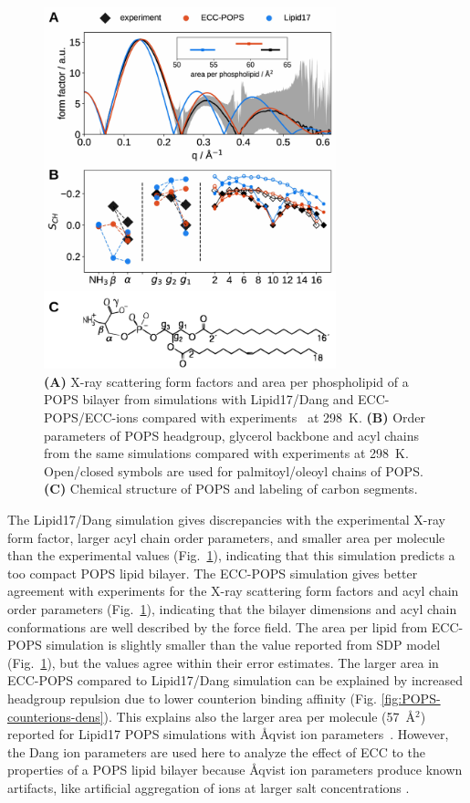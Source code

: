 \documentclass[journal=jctcce,manuscript=article]{achemso}
\begin{document}
\begin{figure}[tb!] 
  \centering 
  \includegraphics[width=3.33in]{../img/formF_OPs_APLinset_POPSchemfig.pdf} 
\hfill
  \caption{\label{simVSexpNOions_POPS} 
    \textbf{(A)} X-ray scattering form factors and area per phospholipid of a POPS bilayer
    from simulations with Lipid17/Dang \citep{lipid17-future, dang2006} and 
    ECC-POPS/ECC-ions \cite{martinek17, Pluhackova2016} compared with experiments~\citep{kucerka14} at 298~K. 
    \textbf{(B)} Order parameters of POPS headgroup, glycerol backbone and acyl chains  
    from the same simulations 
    compared with experiments at 298~K. \citep{NMRlipidsIV}
    Open/closed symbols are used for palmitoyl/oleoyl chains of POPS. 
    \textbf{(C)} Chemical structure of POPS and labeling of carbon segments. 
  }  
\end{figure} 


The Lipid17/Dang simulation gives 
discrepancies with the experimental X-ray form factor,
larger acyl chain order parameters,
and smaller area per molecule than the experimental values (Fig.~\ref{simVSexpNOions_POPS}),
indicating that this simulation predicts a too compact POPS lipid bilayer. 
The ECC-POPS simulation gives better agreement with experiments for the X-ray scattering form factors and 
acyl chain order parameters (Fig.~\ref{simVSexpNOions_POPS}),
indicating that the bilayer dimensions and acyl chain
conformations are well described by the force field. The area per lipid from ECC-POPS simulation is slightly
smaller than the value reported from SDP model \cite{kucerka14} (Fig.~\ref{simVSexpNOions_POPS}), but the values
agree within their error estimates. The larger area in ECC-POPS compared to Lipid17/Dang simulation can be
explained by increased headgroup repulsion due to lower counterion binding affinity (Fig. \ref{fig:POPS-counterions-dens}).
This explains also the larger area per molecule (57~\AA$^2$) reported for Lipid17 POPS simulations
with {\AA}qvist ion parameters~\cite{NMRlipidsIV}.
However, the Dang ion parameters are used here to analyze the effect of ECC to the properties of a POPS lipid bilayer because
{\AA}qvist ion parameters produce known artifacts, like artificial aggregation of ions at larger salt concentrations \cite{kohagen16, chen07, NMRlipidsIV}.
\end{document}

